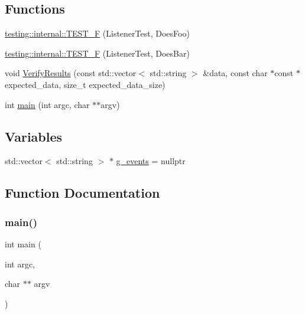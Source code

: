 \subsection*{Functions}
\begin{DoxyCompactItemize}
\item 
\mbox{\hyperlink{namespacetesting_1_1internal_a7e113e9c70d45d89fe1703e58ff083b9}{testing\+::internal\+::\+T\+E\+S\+T\+\_\+F}} (Listener\+Test, Does\+Foo)
\item 
\mbox{\hyperlink{namespacetesting_1_1internal_a02cef32090020d164460dd3d9f8e2852}{testing\+::internal\+::\+T\+E\+S\+T\+\_\+F}} (Listener\+Test, Does\+Bar)
\item 
void \mbox{\hyperlink{googletest-master_2googletest_2test_2googletest-listener-test_8cc_ab9d583cd17d35925ad3d12f864d57fe9}{Verify\+Results}} (const std\+::vector$<$ std\+::string $>$ \&data, const char $\ast$const $\ast$expected\+\_\+data, size\+\_\+t expected\+\_\+data\+\_\+size)
\item 
int \mbox{\hyperlink{googletest-master_2googletest_2test_2googletest-listener-test_8cc_a3c04138a5bfe5d72780bb7e82a18e627}{main}} (int argc, char $\ast$$\ast$argv)
\end{DoxyCompactItemize}
\subsection*{Variables}
\begin{DoxyCompactItemize}
\item 
std\+::vector$<$ std\+::string $>$ $\ast$ \mbox{\hyperlink{googletest-master_2googletest_2test_2googletest-listener-test_8cc_a32a264046f3603db11e6fcdaea5fb094}{g\+\_\+events}} = nullptr
\end{DoxyCompactItemize}


\subsection{Function Documentation}
\mbox{\label{googletest-master_2googletest_2test_2googletest-listener-test_8cc_a3c04138a5bfe5d72780bb7e82a18e627}} 
\subsubsection{\texorpdfstring{main()}{main()}}
{\footnotesize\ttfamily int main (\begin{DoxyParamCaption}\item[{int}]{argc,  }\item[{char $\ast$$\ast$}]{argv }\end{DoxyParamCaption})}

